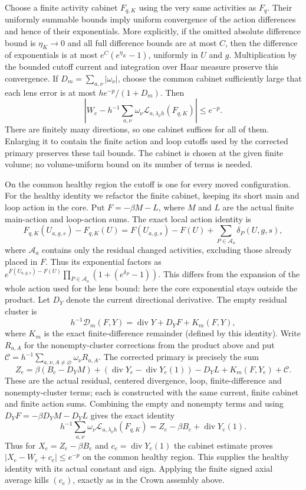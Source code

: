 Choose a finite activity cabinet $F_{q,K}$ using the very same activities
as $F_q$. Their uniformly summable bounds imply uniform convergence of
the action differences and hence of their exponentials. More explicitly,
if the omitted absolute difference bound is $\eta_K\to0$ and all full
difference bounds are at most $C$, then the difference of exponentials
is at most $e^C(e^{\eta_K}-1)$, uniformly in $U$ and $g$.
Multiplication by the bounded cutoff current and integration over Haar
measure preserve this convergence. If
$D_m=\sum_{a,\nu}|\omega_\nu|$, choose the common cabinet sufficiently
large that each lens error is at most
$h e^{-p}/(1+D_m)$. Then
\[
 \left|W_e-h^{-1}\sum_{a,\nu}\omega_\nu
              \mathcal L_{a,\lambda_\nu h}(F_{q,K})\right|
 \le e^{-p}.
\]
There are finitely many directions, so one cabinet suffices for all of
them. Enlarging it to contain the finite action and loop cutoffs used by
the corrected primary preserves these tail bounds. The cabinet is
chosen at the given finite volume; no volume-uniform bound on its number
of terms is needed.

On the common healthy region the cutoff is one for every moved
configuration. For the healthy identity we refactor the finite cabinet,
keeping its short main and loop action in the core. Put
$F=-\beta M-L$, where $M$ and $L$ are the actual finite main-action
and loop-action sums. The exact local action identity is
\[
 F_{q,K}(U_{a,g,s})-F_{q,K}(U)
 =F(U_{a,g,s})-F(U)+\sum_{P\in\mathcal A_a}\delta_P(U,g,s),
\]
where $\mathcal A_a$ contains only the residual changed activities,
excluding those already placed in $F$. Thus its exponential factors as
$e^{F(U_{a,g,s})-F(U)}\prod_{P\in\mathcal A_a}(1+(e^{\delta_P}-1))$.
This differs from the expansion of the whole action used for the lens
bound: here the core exponential stays outside the product. Let $D_Y$
denote the current directional derivative. The empty residual cluster is
\[
 h^{-1}\mathcal D_m(F,Y)=\operatorname{div}Y+D_YF+K_m(F,Y),
\]
where $K_m$ is the exact finite-difference remainder (defined by this
identity). Write $R_{a,A}$ for the nonempty-cluster corrections from the
product above and put
$\mathcal C=h^{-1}\sum_{a,\nu,A\ne\varnothing}\omega_\nu R_{a,A}$.
The corrected primary is precisely the sum
\[
 Z_e=\beta(B_e-D_YM)
       +(\operatorname{div}Y_e-\operatorname{div}Y_e(1))
       -D_YL+K_m(F,Y_e)+\mathcal C.
\]
These are the actual residual, centered divergence, loop, finite-difference
and nonempty-cluster terms; each is constructed with the same current,
finite cabinet and finite action sums. Combining the empty and nonempty
terms and using $D_YF=-\beta D_YM-D_YL$ gives the exact identity
\[
 h^{-1}\sum_{a,\nu}\omega_\nu
       \mathcal L_{a,\lambda_\nu h}(F_{q,K})
       =Z_e-\beta B_e+\operatorname{div}Y_e(1).
\]
Thus for $X_e=Z_e-\beta B_e$ and
$c_e=\operatorname{div}Y_e(1)$ the cabinet estimate proves
$|X_e-W_e+c_e|\le e^{-p}$ on the common healthy region.
This supplies the healthy identity with its actual constant and sign.
Applying the finite signed axial average kills $(c_e)$, exactly as in
the Crown assembly above.

